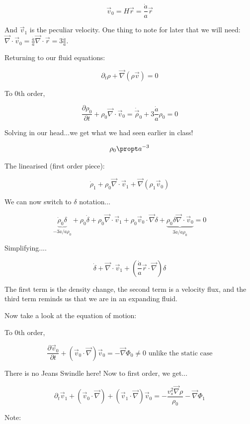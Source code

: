 \documentclass{article}
\newcommand{\be}{\begin{equation}}
\newcommand{\ee}{\end{equation}}
\begin{document}
\be
\vec{v}_0 = H \vec{r} = \frac{\dot{a}}{a} \vec{r}
\ee

And $\vec{v}_1$ is the peculiar velocity. One thing to note for later that we will need: $\vec{\nabla} \cdot \vec{v}_0 = \frac{\dot{a}}{a} \vec{\nabla} \cdot \vec{r} = 3 \frac{\dot{a}}{a}$.

Returning to our fluid equations:

\be
\partial_t \rho + \vec{\nabla} \left(\rho \vec{v}\right) = 0
\ee

To 0th order, 

\be
\frac{\partial \rho_0}{\partial t} + \rho_0 \vec{\nabla} \cdot \vec{v}_0  = \dot{\vec{\rho}}_0 + 3\frac{\dot{a}}{a} \rho_0 = 0 
\ee

Solving in our head...we get what we had seen earlier in class!

\be
\rho_0 \propt a^{-3}
\ee

The linearised (first order piece):

\be
\dot{\rho}_1 + \rho_0 \vec{\nabla} \cdot \vec{v}_1  + \vec{\nabla} \left(\rho_1 \vec{v}_0\right)
\ee

We can now switch to $\delta$ notation...

\be
\underbrace{\dot{\rho}_0 \delta}_{-3\dot{a}/a \rho_0}+ \rho_0 \dot{\delta} + \rho_0 \vec{\nabla} \cdot \vec{v}_1 + \rho_0 \vec{v}_0 \cdot \vec{\nabla} \delta + \underbrace{\rho_0 \delta \vec{\nabla} \cdot \vec{v}_0}_{3\dot{a}/a \rho_0} = 0
\ee

Simplifying....

\be
\boxed{\dot{\delta} + \vec{\nabla} \cdot \vec{v}_1 + \left(\frac{\dot{a}}{a}\vec{r} \cdot \vec{\nabla} \right)\delta}
\ee

The first term is the density change, the second term is a velocity flux, and the third term reminds us that we are in an expanding fluid.

Now take a look at the equation of motion:

To 0th order, 

\be
\frac{\partial \vec{v}_0}{\partial t} + \left(\vec{v}_0 \cdot \vec{\nabla}\right)\vec{v}_0 = -\vec{\nabla} \Phi_0 \neq 0 \text{ unlike the static case}
\ee

There is no Jeans Swindle here! Now to first order, we get...

\be
\partial_t \vec{v}_1 + \left(\vec{v}_0 \cdot \vec{\nabla}\right) + \left(\vec{v}_1 \cdot \vec{\nabla}\right)\vec{v}_0 = -\frac{v_s^2 \vec{\nabla} \rho}{\rho_0} - \vec{\nabla} \Phi_1
\ee

Note:
\end{document}
